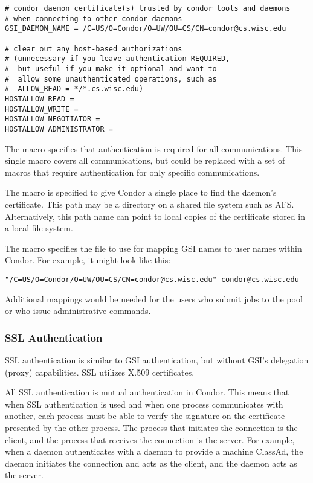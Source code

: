 \begin{description}
\begin{verbatim}
# condor daemon certificate(s) trusted by condor tools and daemons
# when connecting to other condor daemons
GSI_DAEMON_NAME = /C=US/O=Condor/O=UW/OU=CS/CN=condor@cs.wisc.edu

# clear out any host-based authorizations
# (unnecessary if you leave authentication REQUIRED,
#  but useful if you make it optional and want to
#  allow some unauthenticated operations, such as
#  ALLOW_READ = */*.cs.wisc.edu)
HOSTALLOW_READ =
HOSTALLOW_WRITE =
HOSTALLOW_NEGOTIATOR =
HOSTALLOW_ADMINISTRATOR =
\end{verbatim}
\normalsize

The
 macro specifies that
authentication is required for all communications.
This single macro covers all communications, but could be
replaced with a set of macros that require authentication for
only specific communications.

The macro  is specified
to give
Condor a single place to find the daemon's certificate.
This path may be a directory on a shared file system such as AFS. 
Alternatively, this path name can point to 
local copies of the certificate stored
in a local file system.

The macro  specifies the file
to use for mapping GSI names to user names within Condor.  For example,
it might look like this:

\footnotesize
\begin{verbatim}
"/C=US/O=Condor/O=UW/OU=CS/CN=condor@cs.wisc.edu" condor@cs.wisc.edu
\end{verbatim}
\normalsize

Additional mappings would be needed for the users who submit jobs to
the pool or who issue administrative commands.

\end{description}

\subsubsection{\label{sec:SSL-Authentication}SSL Authentication}
SSL authentication is similar to GSI authentication,
but without GSI's delegation (proxy) capabilities.
SSL utilizes X.509 certificates.

All SSL authentication is mutual authentication in Condor.
This means that when SSL authentication is used and when one process
communicates with another, each process must be able to verify the
signature on the certificate presented by the other process.  
The process that initiates the connection is the client,
and the process that receives the connection is the server.
For example, when a  daemon
authenticates with a  daemon
to provide a machine ClassAd,
the  daemon initiates the connection and acts as the client,
and the  daemon acts as the server.

